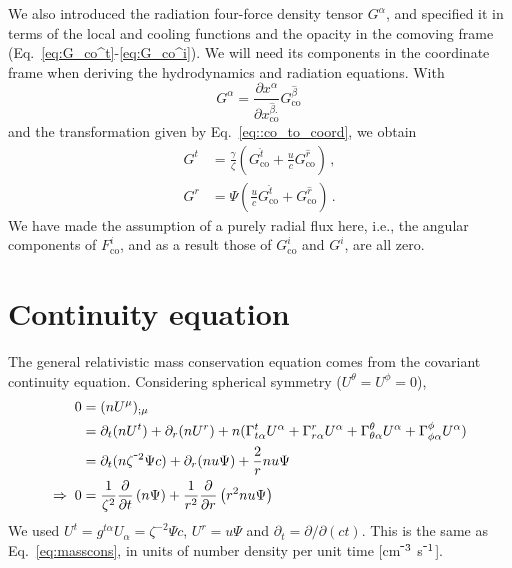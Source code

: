 \documentclass[../main.tex]{subfiles}
\begin{document}
We also introduced the radiation four-force density tensor $G^\alpha$, and specified it in terms of the local and cooling functions and the opacity in the comoving frame (Eq.~\ref{eq:G_co^t}-\ref{eq:G_co^i}). We will need its components in the coordinate frame when deriving the hydrodynamics and radiation equations. With
\begin{equation}
    G^\alpha=\frac{\partial x^\alpha}{\partial x^{\hat{\beta}.}_\text{co}}G^{\hat{\beta}}_\text{co}\,
\end{equation}
and the transformation given by Eq.~\eqref{eq::co_to_coord}, we obtain
\begin{align}
    G^t&=\frac{\gamma}{\zeta}\left(G^{\hat{t}}_\text{co}+\frac{u}{c}G^{\hat{r}}_\text{co}\right)\,,\\
    G^r&=\Psi\left(\frac{u}{c}G^{\hat{t}}_\text{co}+G^{\hat{r}}_\text{co}\right)\,.
\end{align}
We have made the assumption of a purely radial flux here, i.e., the angular components of $F^i_\text{co}$, and as a result those of $G^i_\text{co}$ and $G^i$, are all zero.

\section*{Continuity equation}
The general relativistic mass conservation equation comes from the covariant continuity equation.  Considering spherical symmetry ($U^\theta=U^\phi=0$),
\begin{align}
    0&=(nU^\mu)_{;\mu}\nonumber\\
    &=\partial_t(nU^t)+\partial_r(n U^r)+n(\Gamma^t_{t\alpha}U^\alpha+\Gamma^r_{r\alpha}U^\alpha+\Gamma^\theta_{\theta\alpha}U^\alpha+\Gamma^\phi_{\phi\alpha}U^\alpha)\nonumber\\
    &=\partial_t(n\zeta^{\-2}\Psi c)+\partial_r(n u\Psi)+\frac{2}{r}n u\Psi\nonumber\\
    \Rightarrow\; 0&=\frac{1}{\zeta^2}\Partial{t}{n \Psi}+\frac{1}{r^2}\Partial{r}{r^2n u\Psi}
\end{align}
We used $U^t=g^{t\alpha}U_\alpha=\zeta^{-2}\Psi c$, $U^r=u\Psi$ and $\partial_t=\partial/\partial(ct)$. This is the same as Eq.~\eqref{eq:masscons}, in units of number density per unit time [cm$^{\-3}$ s$^{\-1}$]. 

\end{document}
